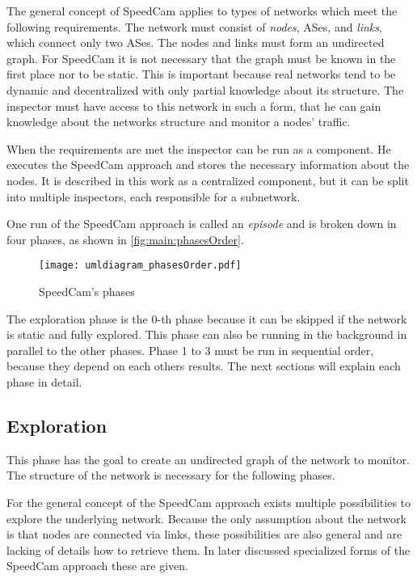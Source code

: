 \documentclass[thesis.tex]{subfiles}
\begin{document}
The general concept of SpeedCam applies to types of networks which meet the following requirements. The network must consist of \textit{nodes}, ASes, and \textit{links}, which connect only two ASes. The nodes and links must form an undirected graph. For SpeedCam it is not necessary that the graph must be known in the first place nor to be static. This is important because real networks tend to be dynamic and decentralized with only partial knowledge about its structure. The inspector must have access to this network in such a form, that he can gain knowledge about the networks structure and monitor a nodes' traffic.

When the requirements are met the inspector can be run as a component. He executes the SpeedCam approach and stores the necessary information about the nodes. It is described in this work as a centralized component, but it can be split into multiple inspectors, each responsible for a subnetwork. 

One run of the SpeedCam approach is called an \textit{episode} and is broken down in four phases, as shown in \autoref{fig:main:phasesOrder}.

\begin{figure}[!h]
	\centering
	\texttt{[image: umldiagram\_phasesOrder.pdf]}
	\caption{SpeedCam's phases}
	\label{fig:main:phasesOrder}
\end{figure}

The exploration phase is the 0-th phase because it can be skipped if the network is static and fully explored. This phase can also be running in the background in parallel to the other phases. Phase 1 to 3 must be run in sequential order, because they depend on each others results. The next sections will explain each phase in detail.

\subsection{Exploration} \label{sec:main:explorationphase}
This phase has the goal to create an undirected graph of the network to monitor. The structure of the network is necessary for the following phases. 

For the general concept of the SpeedCam approach exists multiple possibilities to explore the underlying network. Because the only assumption about the network is that nodes are connected via links, these possibilities are also general and are lacking of details how to retrieve them. In later discussed specialized forms of the SpeedCam approach these are given.
\end{document}
